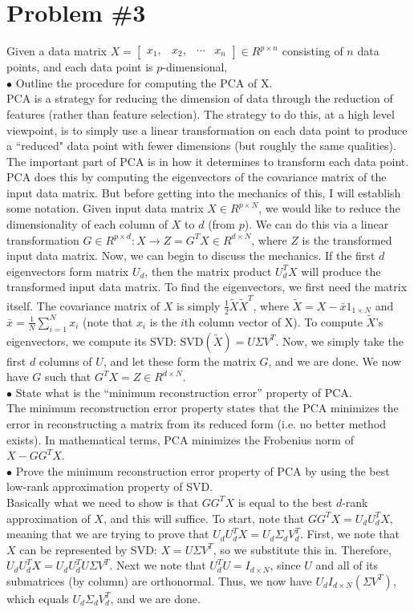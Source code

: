 \documentclass[12pt]{article}
\begin{document}
	\section*{Problem \#3}
	Given a data matrix $X = \left[
	\begin{array}{cccc}
	x_1, & x_2, & \cdots & x_n
	\end{array}
	\right] \in R^{p \times n}$ consisting of $n$ data points, and each data point is $p$-dimensional, \\
	$\bullet$ Outline the procedure for computing the PCA of X.\\
	PCA is a strategy for reducing the dimension of data through the reduction of features (rather than feature selection). The strategy to do this, at a high level viewpoint, is to simply use a linear transformation on each data point to produce a ``reduced" data point with fewer dimensions (but roughly the same qualities). The important part of PCA is in how it determines to transform each data point. PCA does this by computing the eigenvectors of the covariance matrix of the input data matrix. But before getting into the mechanics of this, I will establish some notation. Given input data matrix $X \in R^{p \times N}$, we would like to reduce the dimensionality of each column of $X$ to $d$ (from $p$). We can do this via a linear transformation $G \in R^{p \times d}: X \rightarrow Z = G^T X \in R^{d \times N}$, where $Z$ is the transformed input data matrix. Now, we can begin to discuss the mechanics. If the first $d$ eigenvectors form matrix $U_d$, then the matrix product $U_d^T X$ will produce the transformed input data matrix. To find the eigenvectors, we first need the matrix itself. The covariance matrix of $X$ is simply $\frac{1}{2}\tilde{X}\tilde{X}^T$, where $\tilde{X}=X-\bar{x}1_{1\times N}$ and $\bar{x} = \frac{1}{N}\sum_{i=1}^{N} x_i$ (note that $x_i$ is the $i$th column vector of X). To compute $\tilde{X}$'s eigenvectors, we compute its SVD: $\text{SVD}(\tilde{X}) = U\Sigma V^T$. Now, we simply take the first $d$ columns of $U$, and let these form the matrix $G$, and we are done. We now have $G$ such that $G^T X = Z \in R^{d \times N}$.
	\\
	$\bullet$ State what is the “minimum reconstruction error” property of PCA. \\
	The minimum reconstruction error property states that the PCA minimizes the error in reconstructing a matrix from its reduced form (i.e. no better method exists). In mathematical terms, PCA minimizes the Frobenius norm of $X - GG^T X$.
	\\
	$\bullet$ Prove the minimum reconstruction error property of PCA by using the best low-rank
	approximation property of SVD. \\
	Basically what we need to show is that $GG^T X$ is equal to the best $d$-rank approximation of $X$, and this will suffice. To start, note that $GG^TX = U_dU_d^TX$, meaning that we are trying to prove that $U_dU_d^TX = U_d\Sigma_dV_d^T$. 
	First, we note that $X$ can be represented by SVD: $X=U\Sigma V^T$, so we substitute this in. Therefore, $U_dU_d^TX = U_dU_d^T U\Sigma V^T$. Next we note that $U_d^TU=I_{d \times N}$, since $U$ and all of its submatrices (by column) are orthonormal. Thus, we now have $U_d I_{d \times N} (\Sigma V^T)$, which equals $U_d\Sigma_dV_d^T$, and we are done.
\end{document}
